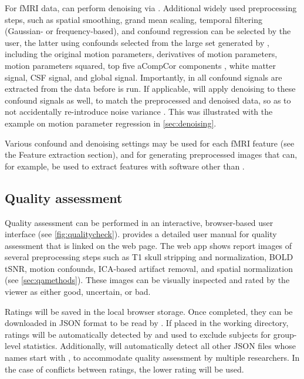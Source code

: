 For fMRI data,  can perform denoising via 
\citep{10.1016/j.neuroimage.2015.02.064}. Additional widely used
preprocessing steps, such as spatial smoothing, grand mean scaling,
temporal filtering (Gaussian- or frequency-based), and confound regression
can be selected by the user, the latter using confounds selected from the
large set generated by , including the original motion
parameters, derivatives of motion parameters, motion parameters squared,
top five aCompCor components \citep{10.1016/j.neuroimage.2007.04.042},
white matter signal, CSF signal, and global signal. Importantly, in
 all confound signals are extracted from the data before
 is run. If applicable,  will apply
denoising to these confound signals as well, to match the preprocessed and
denoised data, so as to not accidentally re-introduce noise variance
\citep{10.1016/j.neuroimage.2013.05.116,10.1002/hbm.24528}. This was
illustrated with the example on motion parameter regression
in \autoref{sec:denoising}.

Various confound and denoising settings may be used for each fMRI feature
(see the Feature extraction section), and for generating preprocessed
images that can, for example, be used to extract features with software
other than .

\subsection{Quality assessment}

Quality assessment can be performed in an interactive, browser-based user
interface (see \autoref{fig:qualitycheck}).  provides a detailed
user manual for quality assessment that is linked on the web page. The web
app shows report images of several preprocessing steps such as T1 skull
stripping and normalization, BOLD tSNR, motion confounds, ICA-based
artifact removal, and spatial normalization (see \autoref{sec:qamethods}).
These images can be visually inspected and rated by the viewer as either
good, uncertain, or bad.

Ratings will be saved in the local browser storage. Once completed, they
can be downloaded in JSON format to be read by . If placed
in the working directory, ratings will be automatically detected by
 and used to exclude subjects for group-level statistics.
Additionally,  will automatically detect all other JSON
files whose names start with , to accommodate quality
assessment by multiple researchers. In the case of conflicts between
ratings, the lower rating will be used.

